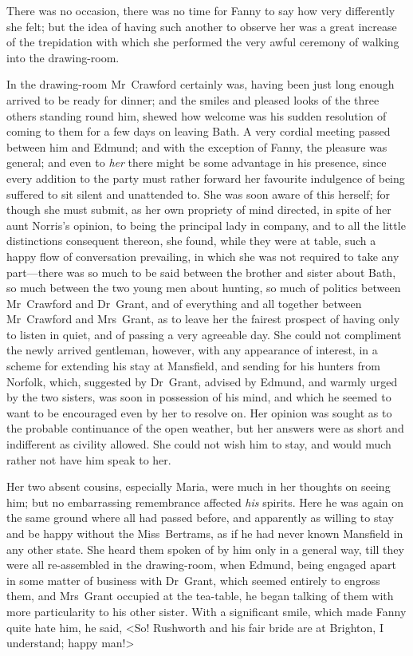 There was no occasion, there was no time for Fanny to say how very differently she felt; but the idea of having such another to observe her was a great increase of the trepidation with which she performed the very awful ceremony of walking into the drawing-room.

In the drawing-room Mr~Crawford certainly was, having been just long enough arrived to be ready for dinner; and the smiles and pleased looks of the three others standing round him, shewed how welcome was his sudden resolution of coming to them for a few days on leaving Bath. A very cordial meeting passed between him and Edmund; and with the exception of Fanny, the pleasure was general; and even to \textit{her}  there might be some advantage in his presence, since every addition to the party must rather forward her favourite indulgence of being suffered to sit silent and unattended to. She was soon aware of this herself; for though she must submit, as her own propriety of mind directed, in spite of her aunt Norris's opinion, to being the principal lady in company, and to all the little distinctions consequent thereon, she found, while they were at table, such a happy flow of conversation prevailing, in which she was not required to take any part—there was so much to be said between the brother and sister about Bath, so much between the two young men about hunting, so much of politics between Mr~Crawford and Dr~Grant, and of everything and all together between Mr~Crawford and Mrs~Grant, as to leave her the fairest prospect of having only to listen in quiet, and of passing a very agreeable day. She could not compliment the newly arrived gentleman, however, with any appearance of interest, in a scheme for extending his stay at Mansfield, and sending for his hunters from Norfolk, which, suggested by Dr~Grant, advised by Edmund, and warmly urged by the two sisters, was soon in possession of his mind, and which he seemed to want to be encouraged even by her to resolve on. Her opinion was sought as to the probable continuance of the open weather, but her answers were as short and indifferent as civility allowed. She could not wish him to stay, and would much rather not have him speak to her.

Her two absent cousins, especially Maria, were much in her thoughts on seeing him; but no embarrassing remembrance affected \textit{his}  spirits. Here he was again on the same ground where all had passed before, and apparently as willing to stay and be happy without the Miss~Bertrams, as if he had never known Mansfield in any other state. She heard them spoken of by him only in a general way, till they were all re-assembled in the drawing-room, when Edmund, being engaged apart in some matter of business with Dr~Grant, which seemed entirely to engross them, and Mrs~Grant occupied at the tea-table, he began talking of them with more particularity to his other sister. With a significant smile, which made Fanny quite hate him, he said, <So! Rushworth and his fair bride are at Brighton, I understand; happy man!>

